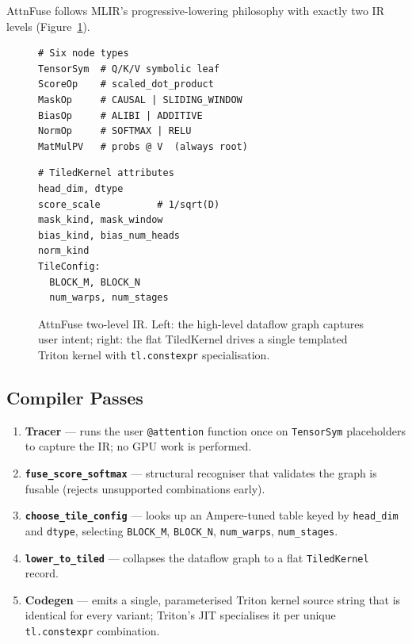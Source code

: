 \documentclass[12pt]{article}
\begin{document}
AttnFuse follows MLIR's progressive-lowering philosophy with exactly two IR
levels (Figure~\ref{fig:ir}).

\begin{figure}[H]
\centering
\begin{minipage}[t]{0.47\linewidth}
\begin{lstlisting}[caption={High-level IR: dataflow graph nodes.},label={lst:hlir}]
# Six node types
TensorSym  # Q/K/V symbolic leaf
ScoreOp    # scaled_dot_product
MaskOp     # CAUSAL | SLIDING_WINDOW
BiasOp     # ALIBI | ADDITIVE
NormOp     # SOFTMAX | RELU
MatMulPV   # probs @ V  (always root)
\end{lstlisting}
\end{minipage}
\hfill
\begin{minipage}[t]{0.47\linewidth}
\begin{lstlisting}[caption={Tiled IR: flat record for codegen.},label={lst:tir}]
# TiledKernel attributes
head_dim, dtype
score_scale          # 1/sqrt(D)
mask_kind, mask_window
bias_kind, bias_num_heads
norm_kind
TileConfig:
  BLOCK_M, BLOCK_N
  num_warps, num_stages
\end{lstlisting}
\end{minipage}
\caption{AttnFuse two-level IR.  Left: the high-level dataflow graph captures
  user intent; right: the flat TiledKernel drives a single templated Triton
  kernel with \texttt{tl.constexpr} specialisation.}
\label{fig:ir}
\end{figure}

\subsection{Compiler Passes}

\begin{enumerate}[leftmargin=1.5em]
  \item \textbf{Tracer} — runs the user \texttt{@attention} function once on
    \texttt{TensorSym} placeholders to capture the IR; no GPU work is
    performed.
  \item \textbf{\texttt{fuse\_score\_softmax}} — structural recogniser that
    validates the graph is fusable (rejects unsupported combinations early).
  \item \textbf{\texttt{choose\_tile\_config}} — looks up an Ampere-tuned
    table keyed by \texttt{head\_dim} and \texttt{dtype}, selecting
    \texttt{BLOCK\_M}, \texttt{BLOCK\_N}, \texttt{num\_warps},
    \texttt{num\_stages}.
  \item \textbf{\texttt{lower\_to\_tiled}} — collapses the dataflow graph to a
    flat \texttt{TiledKernel} record.
  \item \textbf{Codegen} — emits a single, parameterised Triton kernel source
    string that is identical for every variant; Triton's JIT specialises it
    per unique \texttt{tl.constexpr} combination.
\end{enumerate}
\end{document}
